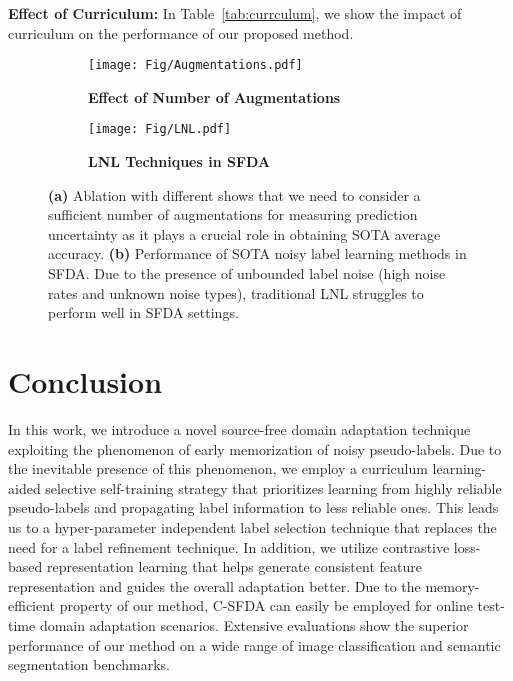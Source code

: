\documentclass[10pt,twocolumn,letterpaper]{article}
\begin{document}
\vspace{0.6mm}
\noindent \textbf{Effect of Curriculum:} In Table~\ref{tab:currculum}, we show the impact of curriculum on the performance of our proposed method.


\begin{figure}[t]
  \centering
  \begin{subfigure}{0.5\linewidth}
    \texttt{[image: Fig/Augmentations.pdf]}
    \caption{\scriptsize \textbf{Effect of Number of Augmentations}}
    \label{fig:augme}
  \end{subfigure}
  \hfill
\begin{subfigure}{0.48\linewidth}
    \texttt{[image: Fig/LNL.pdf]}
    \caption{\scriptsize \textbf{LNL Techniques in SFDA}}
    \label{fig:LNL}
  \end{subfigure}
  \vspace{-1.5mm}
  \caption{\footnotesize \textbf{(a)} Ablation with different  shows that we need to consider a sufficient number of augmentations for measuring prediction uncertainty as it plays a crucial role in obtaining SOTA average accuracy. \textbf{(b)} Performance of SOTA noisy label learning methods in SFDA. Due to the presence of unbounded label noise (\ie high noise rates and unknown noise types), traditional LNL struggles to perform well in SFDA settings.}
  \vspace{-3mm}
\end{figure}
\vspace{-1mm}
\section{Conclusion}
\vspace{-0.5mm}
In this work, we introduce a novel source-free domain adaptation technique exploiting the phenomenon of early memorization of noisy pseudo-labels. Due to the inevitable presence of this phenomenon, we employ a curriculum learning-aided selective self-training strategy that prioritizes learning from highly reliable pseudo-labels and propagating label information to less reliable ones. This leads us to a hyper-parameter independent label selection technique that replaces the need for a label refinement technique. In addition, we utilize contrastive loss-based representation learning that helps generate consistent feature representation and guides the overall adaptation better. Due to the memory-efficient property of our method, C-SFDA can easily be employed for online test-time domain adaptation scenarios. Extensive evaluations show the superior performance of our method on a wide range of image classification and semantic segmentation benchmarks.
\end{document}
